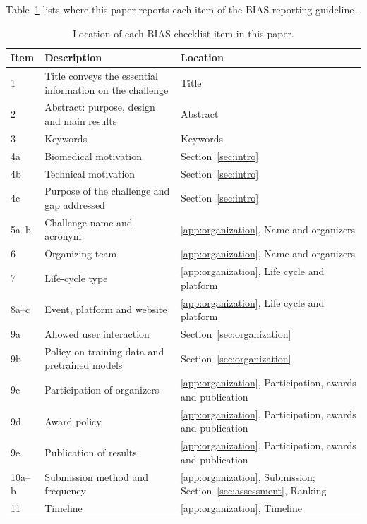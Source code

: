 \setcounter{table}{0}
Table~\ref{tab:bias} lists where this paper reports each item of the BIAS
reporting guideline \citep{maier2020bias}.

\begin{table}[!p]
\centering
\caption{Location of each BIAS checklist item in this paper.}
\label{tab:bias}
\renewcommand{\baselinestretch}{1}\scriptsize
\setlength{\tabcolsep}{4pt}
\renewcommand{\arraystretch}{1.12}
\begin{tabularx}{\textwidth}{l>{\raggedright\arraybackslash}p{}>{\raggedright\arraybackslash}X}
\toprule
Item & Description & Location \\
\midrule
1 & Title conveys the essential information on the challenge & Title \\
2 & Abstract: purpose, design and main results & Abstract \\
3 & Keywords & Keywords \\
4a & Biomedical motivation & Section~\ref{sec:intro} \\
4b & Technical motivation & Section~\ref{sec:intro} \\
4c & Purpose of the challenge and gap addressed & Section~\ref{sec:intro} \\
5a--b & Challenge name and acronym & \ref{app:organization}, Name and organizers \\
6 & Organizing team & \ref{app:organization}, Name and organizers \\
7 & Life-cycle type & \ref{app:organization}, Life cycle and platform \\
8a--c & Event, platform and website & \ref{app:organization}, Life cycle and platform \\
9a & Allowed user interaction & Section~\ref{sec:organization} \\
9b & Policy on training data and pretrained models & Section~\ref{sec:organization} \\
9c & Participation of organizers & \ref{app:organization}, Participation, awards and publication \\
9d & Award policy & \ref{app:organization}, Participation, awards and publication \\
9e & Publication of results & \ref{app:organization}, Participation, awards and publication \\
10a--b & Submission method and frequency & \ref{app:organization}, Submission; Section~\ref{sec:assessment}, Ranking \\
11 & Timeline & \ref{app:organization}, Timeline \\

\end{tabularx}
\end{table}
